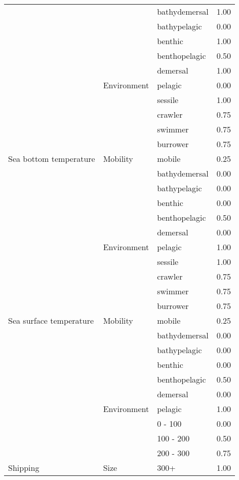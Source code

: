 \documentclass[
  12pt,
]{article}
\begin{document}
\begin{longtable}{llll}
\cmidrule{1-4}
 &  & bathydemersal & 1.00\\
\cmidrule{3-4}
 &  & bathypelagic & 0.00\\
\cmidrule{3-4}
 &  & benthic & 1.00\\
\cmidrule{3-4}
 &  & benthopelagic & 0.50\\
\cmidrule{3-4}
 &  & demersal & 1.00\\
\cmidrule{3-4}
 & \multirow{-6}{*}{\raggedright\arraybackslash Environment} & pelagic & 0.00\\
\cmidrule{2-4}
 &  & sessile & 1.00\\
\cmidrule{3-4}
 &  & crawler & 0.75\\
\cmidrule{3-4}
 &  & swimmer & 0.75\\
\cmidrule{3-4}
 &  & burrower & 0.75\\
\cmidrule{3-4}
\multirow{-11}{*}{\raggedright\arraybackslash Sea bottom temperature} & \multirow{-5}{*}{\raggedright\arraybackslash Mobility} & mobile & 0.25\\
\cmidrule{1-4}
 &  & bathydemersal & 0.00\\
\cmidrule{3-4}
 &  & bathypelagic & 0.00\\
\cmidrule{3-4}
 &  & benthic & 0.00\\
\cmidrule{3-4}
 &  & benthopelagic & 0.50\\
\cmidrule{3-4}
 &  & demersal & 0.00\\
\cmidrule{3-4}
 & \multirow{-6}{*}{\raggedright\arraybackslash Environment} & pelagic & 1.00\\
\cmidrule{2-4}
 &  & sessile & 1.00\\
\cmidrule{3-4}
 &  & crawler & 0.75\\
\cmidrule{3-4}
 &  & swimmer & 0.75\\
\cmidrule{3-4}
 &  & burrower & 0.75\\
\cmidrule{3-4}
\multirow{-11}{*}{\raggedright\arraybackslash Sea surface temperature} & \multirow{-5}{*}{\raggedright\arraybackslash Mobility} & mobile & 0.25\\
\cmidrule{1-4}
 &  & bathydemersal & 0.00\\
\cmidrule{3-4}
 &  & bathypelagic & 0.00\\
\cmidrule{3-4}
 &  & benthic & 0.00\\
\cmidrule{3-4}
 &  & benthopelagic & 0.50\\
\cmidrule{3-4}
 &  & demersal & 0.00\\
\cmidrule{3-4}
 & \multirow{-6}{*}{\raggedright\arraybackslash Environment} & pelagic & 1.00\\
\cmidrule{2-4}
 &  & 0 - 100 & 0.00\\
\cmidrule{3-4}
 &  & 100 - 200 & 0.50\\
\cmidrule{3-4}
 &  & 200 - 300 & 0.75\\
\cmidrule{3-4}
\multirow{-10}{*}{\raggedright\arraybackslash Shipping} & \multirow{-4}{*}{\raggedright\arraybackslash Size} & 300+ & 1.00\\*
\end{longtable}
\end{document}
